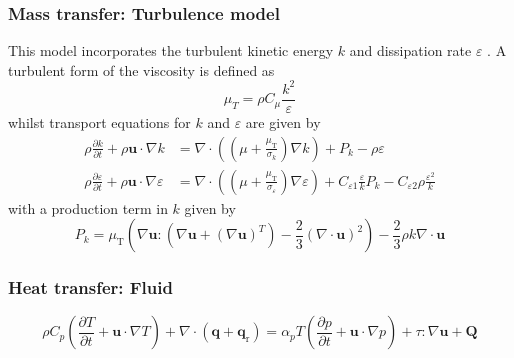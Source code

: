 \subsubsection{Mass transfer: Turbulence model}
This model incorporates the turbulent kinetic energy $k$ and dissipation rate $\varepsilon$ \cite{comsol_cfd_2020}. A turbulent form of the viscosity is defined as
\begin{equation}
    \mu_{T}=\rho C_{\mu} \frac{k^{2}}{\varepsilon}
\end{equation}
whilst transport equations for $k$ and $\varepsilon$ are given by
\begin{align}
    \rho \frac{\partial k}{\partial t}+\rho \mathbf{u} \cdot \nabla k &= \nabla \cdot\left(\left(\mu+\frac{\mu_{\mathrm{T}}}{\sigma_{k}}\right) \nabla k\right)+P_{k}-\rho \varepsilon \\
    \rho \frac{\partial \varepsilon}{\partial t}+\rho \mathbf{u} \cdot \nabla \varepsilon &= \nabla \cdot\left(\left(\mu+\frac{\mu_{\mathrm{T}}}{\sigma_{\varepsilon}}\right) \nabla \varepsilon\right)+C_{\varepsilon 1} \frac{\varepsilon}{k} P_{k}-C_{\varepsilon 2} \rho \frac{\varepsilon^{2}}{k}
\end{align}
with a production term in $k$ given by
\begin{equation}
    P_{k}=\mu_{\mathrm{T}}\left(\nabla \mathbf{u}:\left(\nabla \mathbf{u}+(\nabla \mathbf{u})^{T}\right)-\frac{2}{3}(\nabla \cdot \mathbf{u})^{2}\right)-\frac{2}{3} \rho k \nabla \cdot \mathbf{u}
\end{equation}

\subsubsection{Heat transfer: Fluid}
\cite{comsol_heat_2020}
\begin{equation}
    \rho C_{p}\left(\frac{\partial T}{\partial t}+\mathbf{u} \cdot \nabla T\right)+\nabla \cdot\left(\mathbf{q}+\mathbf{q}_{\mathrm{r}}\right)=\alpha_{p} T\left(\frac{\partial p}{\partial t}+\mathbf{u} \cdot \nabla p\right)+\tau: \nabla \mathbf{u}+\mathbf{Q}
\end{equation}

